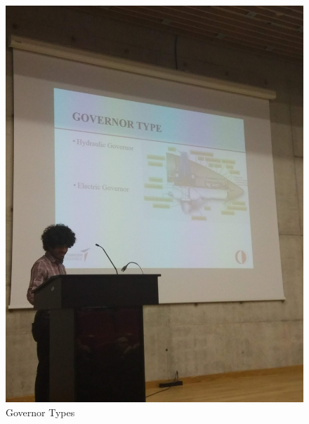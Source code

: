 \documentclass[a4paper,12pt]{article}
\begin{document}
\begin{itemize}
\begin{figure}[H]
\center
\setlength{\unitlength}{\textwidth} 
\includegraphics[width=1.0\unitlength]{2}
\caption{\label{fig:gv} Governor Types  }
\end{figure}
	
	
	
\end{itemize}



\end{document}
